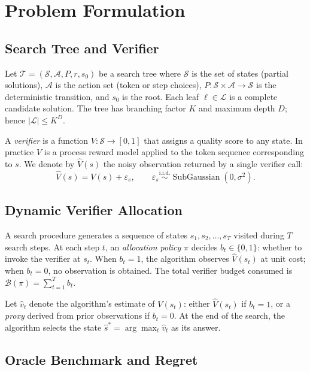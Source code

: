\section{Problem Formulation}
\label{sec:formulation}

\subsection{Search Tree and Verifier}

Let $\mathcal{T} = (\mathcal{S}, \mathcal{A}, P, r, s_0)$ be a search tree where
$\mathcal{S}$ is the set of states (partial solutions), $\mathcal{A}$ is the action
set (token or step choices), $P: \mathcal{S} \times \mathcal{A} \to \mathcal{S}$
is the deterministic transition, and $s_0$ is the root. Each leaf $\ell \in \mathcal{L}$
is a complete candidate solution. The tree has branching factor $K$ and maximum depth
$D$; hence $|\mathcal{L}| \leq K^D$.

A \emph{verifier} is a function $V: \mathcal{S} \to [0,1]$ that assigns a quality
score to any state. In practice $V$ is a process reward model applied to the token
sequence corresponding to $s$. We denote by $\hat{V}(s)$ the noisy observation returned
by a single verifier call:
\[
  \hat{V}(s) = V(s) + \varepsilon_s,
  \qquad \varepsilon_s \overset{\text{i.i.d.}}{\sim} \operatorname{SubGaussian}(0, \sigma^2).
\]

\subsection{Dynamic Verifier Allocation}

A search procedure generates a sequence of states $s_1, s_2, \ldots, s_T$ visited
during $T$ search steps. At each step $t$, an \emph{allocation policy} $\pi$ decides
$b_t \in \{0, 1\}$: whether to invoke the verifier at $s_t$. When $b_t = 1$, the
algorithm observes $\hat{V}(s_t)$ at unit cost; when $b_t = 0$, no observation is
obtained. The total verifier budget consumed is $\mathcal{B}(\pi) = \sum_{t=1}^T b_t$.

Let $\hat{v}_t$ denote the algorithm's estimate of $V(s_t)$: either $\hat{V}(s_t)$
if $b_t = 1$, or a \emph{proxy} derived from prior observations if $b_t = 0$. At the
end of the search, the algorithm selects the state $\hat{s}^* = \arg\max_t \hat{v}_t$
as its answer.

\subsection{Oracle Benchmark and Regret}

